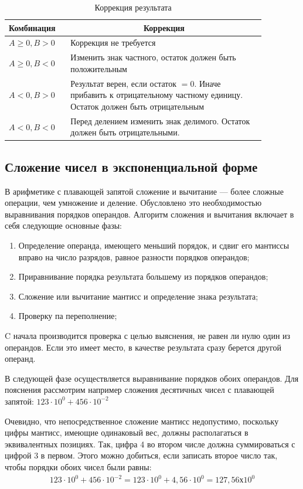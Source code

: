 \documentclass[a4paper,14pt]{extarticle}
\begin{document}
\begin{table}[h!]
	\centering
	\begin{tabular}{|m{0.2\linewidth}|m{0.67\linewidth}|}
		\hline
		\textbf{Комбинация} &\multicolumn{1}{c|}{\textbf{Коррекция}}\\
		\hline
		$A\ge0, B>0 $ &Коррекция не требуется \\ 
		\hline
		$A\ge0, B<0$ & Изменить знак частного, остаток должен быть положительным\\
		\hline
		$A<0, B>0$ & Результат верен, если остаток $=0$. Иначе прибавить к отрицательному частному единицу. Остаток должен быть отрицательным\\
		\hline
		$A< 0, B< 0$ & Перед делением изменить знак делимого. Остаток должен быть отрицательными.\\
		\hline
	\end{tabular}
	\caption{Коррекция результата}
	\label{tab:correction4}
\end{table}
\subsection{Сложение чисел в экспоненциальной форме}
В арифметике с плавающей запятой сложение и вычитание — более сложные операции, чем умножение и деление. Обусловлено это необходимостью выравнивания порядков операндов. Алгоритм сложения и вычитания включает в себя следующие основные фазы:
\begin{enumerate}
	\item Определение операнда, имеющего меньший порядок, и сдвиг его мантиссы вправо на число разрядов, равное разности порядков операндов;
	\item Приравнивание порядка результата большему из порядков операндов;
	\item Сложение или вычитание мантисс и определение знака результата;
	\item Проверку па переполнение;
\end{enumerate}
C начала производится проверка с целью выяснения, не равен ли нулю один из операндов. Если это имеет место, в качестве результата сразу берется другой операнд.

В следующей фазе осуществляется выравнивание порядков обоих операндов. Для пояснения рассмотрим например сложения десятичных чисел с плавающей запятой: $123 \cdot 10^0 + 456 \cdot 10^{-2}$

Очевидно, что непосредственное сложение мантисс недопустимо, поскольку цифры мантисс, имеющие одинаковый вес, должны располагаться в эквивалентных позициях. Так, цифра 4 во втором числе должна суммироваться с цифрой 3 в первом. Этого можно добиться, если записать второе число так, чтобы порядки обоих чисел были равны:
\begin{align*}
123 \cdot 10^0 + 456 \cdot 10^{-2}= 123 \cdot 10^0 + 4,56 \cdot 10^0 = 127,56 х 10^0
\end{align*}
\end{document}
